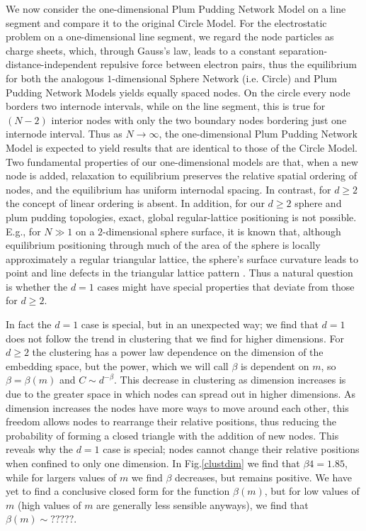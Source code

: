 \documentclass[aps,pre,reprint,superscriptaddress,amsmath,amssymb,nofootinbib]{revtex4-1}
\begin{document}
We now consider the one-dimensional Plum Pudding Network Model on a line segment and compare it to the original Circle Model.
For the electrostatic problem on a one-dimensional line segment, we regard the node particles as charge sheets, which, through Gauss's law, leads to a constant separation-distance-independent repulsive force between electron pairs, thus the equilibrium for both the analogous $1$-dimensional Sphere Network (i.e. Circle) and Plum Pudding Network Models yields equally spaced nodes. 
On the circle every node borders two internode intervals, while on the line segment, this is true for $(N-2)$ interior nodes with only the two boundary nodes bordering just one internode interval.
Thus as $N \to \infty$, the one-dimensional Plum Pudding Network Model is expected to yield results that are identical to those of the Circle Model.
Two fundamental properties of our one-dimensional models are that, when a new node is added, relaxation to equilibrium preserves the relative spatial ordering of nodes, and the equilibrium has uniform internodal spacing.
In contrast, for $d \geq 2$ the concept of linear ordering is absent.
In addition, for our $d \geq 2$ sphere and plum pudding topologies, exact, global regular-lattice positioning is not possible.
E.g., for $N \gg 1$ on a $2$-dimensional sphere surface, it is known that, although equilibrium positioning through much of the area of the sphere is locally approximately a regular triangular lattice, the sphere's surface curvature leads to point and line defects in the triangular lattice pattern \cite{nelson}.
Thus a natural question is whether the $d = 1$ cases might have special properties that deviate from those for $d \geq 2$.

In fact the $d = 1$ case is special, but in an unexpected way; we find that $d = 1$ does not follow the trend in clustering that we find for higher dimensions. 
For $d \geq 2$ the clustering has a power law dependence on the dimension of the embedding space, but the power, which we will call $\beta$ is dependent on $m$, so $\beta = \beta(m)$ and $C \sim d^{-\beta}$.
This decrease in clustering as dimension increases is due to the greater space in which nodes can spread out in higher dimensions.
As dimension increases the nodes have more ways to move around each other, this freedom allows nodes to rearrange their relative positions, thus reducing the probability of forming a closed triangle with the addition of new nodes.
This reveals why the $d = 1$ case is special; nodes cannot change their relative positions when confined to only one dimension.
In Fig.\ref{clustdim} we find that $\beta{4} = 1.85$, while for largers values of $m$ we find $\beta$ decreases, but remains positive.
We have yet to find a conclusive closed form for the function $\beta(m)$, but for low values of $m$ (high values of $m$ are generally less sensible anyways), we find that $\beta(m) \sim ?????$.
\end{document}
